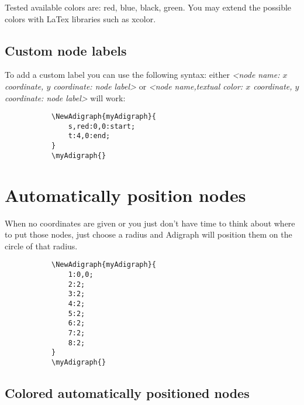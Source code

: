 \documentclass{report}
\begin{document}
Tested available colors are: red, blue, black, green. You may extend the possible colors with LaTex libraries such as xcolor.

\subsection{Custom node labels}
To add a custom label you can use the following syntax: either \textit{<node name: \(x\) coordinate, \(y\) coordinate: node label>} or \textit{<node name,textual color: \(x\) coordinate, \(y\) coordinate: node label>} will work:

\begin{figure}
	\begin{subfigure}{0.49\textwidth}
		\begin{verbatim}
\NewAdigraph{myAdigraph}{
 	s,red:0,0:start;
 	t:4,0:end;
}
\myAdigraph{}
\end{verbatim}
	\end{subfigure}
	\begin{subfigure}{0.49\textwidth}
		\myAdigraph{}
	\end{subfigure}
\end{figure}

\section{Automatically position nodes}
When no coordinates are given or you just don't have time to think about where to put those nodes, just choose a radius and Adigraph will position them on the circle of that radius.

\begin{figure}
	\begin{subfigure}{0.49\textwidth}
		\begin{verbatim}
\NewAdigraph{myAdigraph}{
	1:0,0;
	2:2;
	3:2;
	4:2;
	5:2;
	6:2;
	7:2;
	8:2;
}
\myAdigraph{}
\end{verbatim}
	\end{subfigure}
	\begin{subfigure}{0.49\textwidth}
		\myAdigraph{}
	\end{subfigure}
\end{figure}

\subsection{Colored automatically positioned nodes}
\end{document}
